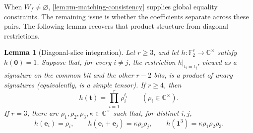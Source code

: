 \documentclass[11pt,letterpaper,onecolumn]{article}
\theoremstyle{plain}
\newtheorem{lemma}[lemma]{Lemma}
\theoremstyle{definition}
\theoremstyle{remark}
\newcommand{\Ftwo}{\mathbb F_2}
\newcommand{\one}{\mathbf 1}
\newcommand{\zero}{\mathbf 0}
\begin{document}
When \(W_f\ne\varnothing\), \cref{lem:rm-matching-consistency} supplies
global equality constraints.  The remaining issue is whether the
coefficients separate across these pairs.  The following lemma recovers
that product structure from diagonal restrictions.

\begin{lemma}[Diagonal-slice integration]
\label{lem:diagonal-slice-integration}
Let \(r\ge3\), and let \(h:\Ftwo^r\to\mathbb C^\times\) satisfy
\(h(\zero)=1\).  Suppose that, for every \(i\ne j\), the restriction
\(h|_{t_i=t_j}\), viewed as a signature on the common bit and the other
\(r-2\) bits, is a product of unary signatures (equivalently, is a simple
tensor).  If \(r\ge4\), then
\[
  h({\mathbf t})=\prod_{i=1}^r\rho_i^{t_i}
  \qquad(\rho_i\in\mathbb C^\times).
\]
If \(r=3\), there are
\(\rho_1,\rho_2,\rho_3,\kappa\in\mathbb C^\times\) such that, for distinct
\(i,j\),
\begin{equation}
  h({\mathbf{e}}_i)=\rho_i,\qquad
  h({\mathbf{e}}_i+{\mathbf{e}}_j)=\kappa\rho_i\rho_j,\qquad
  h(\one^3)=\kappa\rho_1\rho_2\rho_3.
  \label{eq:diagonal-slice-q3-table}
\end{equation}
\end{lemma}
\end{document}
